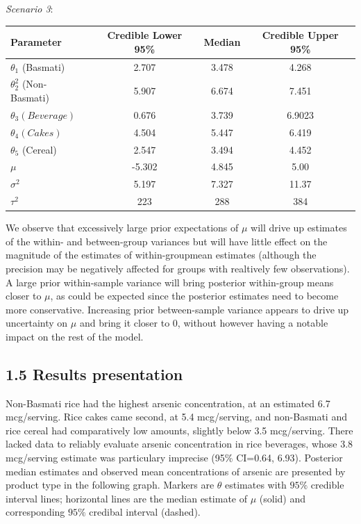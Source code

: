 \documentclass[]{article}
\begin{document}
\textit{Scenario 3}:

\begin{center}
  \begin{tabular}{l c c c}
  \hline Parameter & Credible Lower 95\% & Median & Credible Upper 95\% \\ \hline
    $\theta_1$ (Basmati)& 2.707 & 3.478 & 4.268\\
    $\theta_2^2$ (Non-Basmati)& 5.907 & 6.674 & 7.451 \\
    $\theta_3 (Beverage)$& 0.676 & 3.739 & 6.9023 \\
    $\theta_4 (Cakes)$& 4.504 & 5.447 & 6.419\\
    $\theta_5$ (Cereal)& 2.547 & 3.494 & 4.452\\
    $\mu$ &-5.302 & 4.845 & 5.00\\
    $\sigma^2$ &5.197 & 7.327 & 11.37\\
    $\tau^2$ &223 & 288 & 384\\ \hline
  \end{tabular}
\end{center}

We observe that excessively large prior expectations of \(\mu\) will
drive up estimates of the within- and between-group variances but will
have little effect on the magnitude of the estimates of within-groupmean
estimates (although the precision may be negatively affected for groups
with realtively few observations). A large prior within-sample variance
will bring posterior within-group means closer to \(\mu\), as could be
expected since the posterior estimates need to become more conservative.
Increasing prior between-sample variance appears to drive up uncertainty
on \(\mu\) and bring it closer to \(0\), without however having a
notable impact on the rest of the model.

\subsection{1.5 Results presentation}

Non-Basmati rice had the highest arsenic concentration, at an estimated
6.7 mcg/serving. Rice cakes came second, at 5.4 mcg/serving, and
non-Basmati and rice cereal had comparatively low amounts, slightly
below 3.5 mcg/serving. There lacked data to reliably evaluate arsenic
concentration in rice beverages, whose 3.8 mcg/serving estimate was
particulary imprecise (95\% CI=0.64, 6.93). Posterior median estimates
and observed mean concentrations of arsenic are presented by product
type in the following graph. Markers are \(\theta\) estimates with
\(95\%\) credible interval lines; horizontal lines are the median
estimate of \(\mu\) (solid) and corresponding \(95\%\) credibal interval
(dashed).
\end{document}
